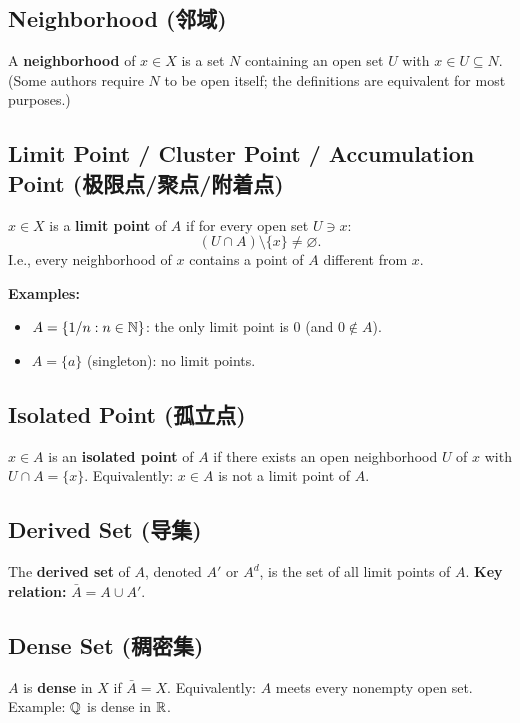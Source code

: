 \documentclass{article}
\begin{document}
\subsection{Neighborhood (邻域)}\label{def:neighborhood}
A \textbf{neighborhood} of $x \in X$ is a set $N$ containing an open
set $U$ with $x \in U \subseteq N$.
(Some authors require $N$ to be open itself; the definitions are
equivalent for most purposes.)

\subsection{Limit Point / Cluster Point / Accumulation Point
(极限点/聚点/附着点)}\label{def:limit-point}
\begin{definition}
  $x \in X$ is a \textbf{limit point} of $A$ if for every open set $U \ni x$:
  \[
    (U \cap A) \setminus \{x\} \ne \varnothing.
  \]
  I.e., every neighborhood of $x$ contains a point of $A$ different from $x$.
\end{definition}
\textbf{Examples:}
\begin{itemize}
  \item $A = \{1/n : n \in \mathbb{N}\}$: the only limit point is $0$ (and $0
    \notin A$).
  \item $A = \{a\}$ (singleton): no limit points.
\end{itemize}

\subsection{Isolated Point (孤立点)}\label{def:isolated}
$x \in A$ is an \textbf{isolated point} of $A$ if there exists an
open neighborhood $U$ of $x$ with $U \cap A = \{x\}$.
Equivalently: $x \in A$ is not a limit point of $A$.

\subsection{Derived Set (导集)}\label{def:derived}
The \textbf{derived set} of $A$, denoted $A'$ or $A^d$, is the set of
all limit points of $A$.
\textbf{Key relation:} $\bar{A} = A \cup A'$.

\subsection{Dense Set (稠密集)}\label{def:dense}
$A$ is \textbf{dense} in $X$ if $\bar{A} = X$. Equivalently: $A$
meets every nonempty open set.
Example: $\mathbb{Q}$ is dense in $\mathbb{R}$.
\end{document}
